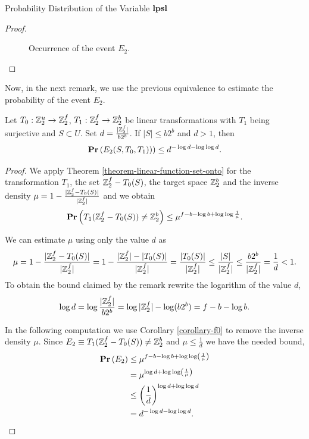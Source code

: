 \begin{section}{Probability Distribution of the Variable \texorpdfstring{$\mathbf{lpsl}$}{lpsl}}
\begin{proof}
\begin{figure}
  \caption{Occurrence of the event $E_2$.}
\end{figure}

\end{proof}

Now, in the next remark, we use the previous equivalence to estimate the probability of the event $E_2$.
\begin{remark}
\label{remark-e2-probability}
Let $T_0: \mathbb{Z}_{2}^{u} \rightarrow \mathbb{Z}_{2}^{f}$, $T_1: \mathbb{Z}_{2}^{f} \rightarrow \mathbb{Z}_{2}^{b}$ be linear transformations with $T_1$ being surjective and $S \subset U$. Set $d = \frac{|\mathbb{Z}_{2}^{f}|}{b 2 ^ b}$. If $|S| \leq b2 ^ b$ and $d > 1$, then 
\[
	\mathbf{Pr}\left(E_2(S, T_0, T_1))\right) \leq d^{-\log d - \log \log d} \text{.}
\]
\end{remark}
\begin{proof}

We apply Theorem \ref{theorem-linear-function-set-onto} for the transformation $T_1$, the set $\mathbb{Z}_{2}^{f} - T_0(S)$, the target space $\mathbb{Z}_{2}^{b}$ and the inverse density $\mu = 1 - \frac{|\mathbb{Z}_{2}^{f} - T_0(S)|}{|\mathbb{Z}_{2}^{f}|}$ and we obtain
\[
	\mathbf{Pr}\left(T_1(\mathbb{Z}_{2}^{f} - T_0(S)) \neq \mathbb{Z}_{2}^{b}\right) \leq \mu ^ {f - b - \log b + \log \log \frac{1}{\mu}} \text{.}
\]

We can estimate $\mu$ using only the value $d$ as
\[
	\mu = 1 - \frac{|\mathbb{Z}_{2}^{f} - T_0(S)|}{|\mathbb{Z}_{2}^{f}|} = 1 - \frac{|\mathbb{Z}_{2}^{f}| - |T_0(S)|}{|\mathbb{Z}_{2}^{f}|} = \frac{|T_0(S)|}{|\mathbb{Z}_{2}^{f}|} \leq \frac{|S|}{|\mathbb{Z}_{2}^{f}|} \leq \frac{b2^b}{|\mathbb{Z}_{2}^{f}|} = \frac{1}{d} < 1 \text{.}
\]
To obtain the bound claimed by the remark rewrite the logarithm of the value $d$,
\[
	\log d = \log \frac{|\mathbb{Z}_{2}^{f}|}{b2^b} = \log |\mathbb{Z}_{2}^{f}| - \log (b 2 ^ b) = f - b - \log b \text{.}
\]

In the following computation we use Corollary \ref{corollary-f0} to remove the inverse density $\mu$. Since $E_2 \equiv T_1(\mathbb{Z}_{2}^{f} - T_0(S)) \neq \mathbb{Z}_{2}^{b}$ and $\mu \leq \frac{1}{d}$ we have the needed bound,
\[
\begin{split}
\mathbf{Pr}\left(E_2\right)
	& \leq \mu^{f - b - \log b + \log \log \left(\frac{1}{\mu}\right)} \\
	& = \mu ^ {\log d + \log \log \left(\frac{1}{\mu}\right)} \\
	& \leq \left(\frac{1}{d}\right) ^ {\log d + \log \log d} \\
	& = d ^ {-\log d - \log \log d} \text{.} \\
\end{split}
\]


\end{proof}
\end{section}
